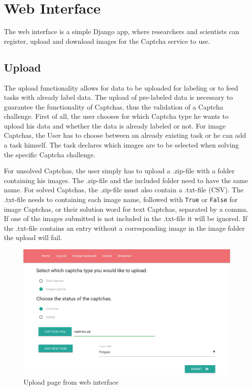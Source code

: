 \section{Web Interface}
\label{sec:web_interface}

The web interface is a simple Django app, where researchers and scientists can register, upload and download images for the Captcha service to use.

\subsection{Upload}

The upload functionality allows for data to be uploaded for labeling or to feed tasks with already label data. The upload of pre-labeled data is necessary to guarantee the functionality of Captchas, thus the validation of a Captcha challenge.
First of all, the user chooses for which Captcha type he wants to upload his data and whether the data is already labeled or not.
For image Captchas, the User has to choose between an already existing task or he can add a task himself. The task declares which images are to be selected when solving the specific Captcha challenge.

For unsolved Captchas, the user simply has to upload a .zip-file with a folder containing his images. The .zip-file and the included folder need to have the same name.
For solved Captchas, the .zip-file must also contain a .txt-file (CSV). The .txt-file needs to containing each image name, followed with \verb|True| or \verb|False| for image Captchas, or their solution word for text Captchas, separated by a comma. If one of the images submitted is not included in the .txt-file it will be ignored. If the .txt-file contains an entry without a corresponding image in the image folder the upload will fail. 
\begin{figure}[H]
\centering
\includegraphics[width=1\linewidth]{content/figures/upload.png}
\caption{Upload page from web interface}
\label{fig:upload}
\end{figure}

